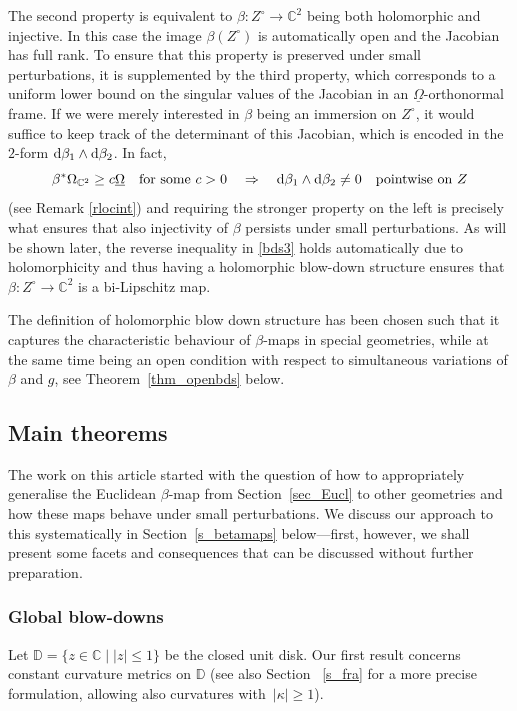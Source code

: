 \documentclass[10pt,a4paper]{amsart}
\numberwithin{equation}{section}
\theoremstyle{definition}
\newcommand{\C}{\mathbb{C}} %
\newcommand{\DD}{\mathbb{D}} %
\newcommand{\1}{{\bf 1}}
\newcommand{\Om}{{\underline{\Omega}}}
\begin{document}
The second property is equivalent to $\beta\colon Z^\circ \rightarrow \C^2$ being both holomorphic and injective. In this case the image $\beta(Z^\circ)$ is automatically open and the Jacobian has full rank. To ensure that this property is preserved under small perturbations, it is supplemented by the third property, which corresponds to a uniform lower bound on the singular values of the Jacobian in an $\Om$-orthonormal frame. If we were merely interested in $\beta$ being an immersion on $Z^\circ$, it would suffice to keep track of the determinant of this Jacobian, which is encoded in the $2$-form ${\rm d}\beta_1\wedge {\rm d}\beta_2$. In fact,
\begin{equation}\label{locint}
\beta^*\Omega_{\C^2} \ge c \Om \quad\text{for some} \  c>0\quad \Rightarrow \quad {\rm d}\beta_1\wedge {\rm d}\beta_2 \neq 0 \quad\text{pointwise on} \  Z
\end{equation}
(see Remark \ref{rlocint}) and requiring the stronger property on the left is
 precisely what ensures that also injectivity of $\beta$ persists under small perturbations. As will be shown later, the reverse inequality in \ref{bds3} holds automatically due to holomorphicity and thus having a holomorphic blow-down structure ensures that $\beta\colon Z^\circ \rightarrow \C^2$ is a bi-Lipschitz map.

The definition of holomorphic blow down structure has been chosen such that it captures the characteristic behaviour of $\beta$-maps in special geometries, while at the same time being an open condition with respect to simultaneous variations of $\beta$ and $g$, see Theorem~\ref{thm_openbds} below.








\subsection{Main theorems}
The work on this article started with the question of how to appropriately generalise the Euclidean $\beta$-map from Section~\ref{sec_Eucl} to other geometries and how these maps behave under small perturbations.
 We discuss our approach to this systematically in Section~\ref{s_betamaps} below---first, however, we shall present some facets and consequences that can be discussed without further preparation.


\subsubsection{Global blow-downs} Let $\DD=\{z\in \C \mid |z|\le 1\}$ be the closed unit disk. Our first result concerns constant curvature metrics on $\DD$ (see also Section~ \ref{s_fra} for a more precise formulation, allowing also curvatures with~${|\kappa|\ge 1}$).
\end{document}
